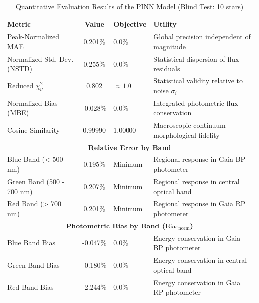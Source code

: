 
\begin{table}[htpb]
\centering
\caption{Quantitative Evaluation Results of the PINN Model (Blind Test: 10 stars)}
\label{tab:pinn_evaluation}
\begin{tabular}{lcll}
\hline
\textbf{Metric} & \textbf{Value} & \textbf{Objective} & \textbf{Utility} \\
\hline
Peak-Normalized MAE & 0.201\% & 0.0\% & Global precision independent of magnitude \\
Normalized Std. Dev. (NSTD) & 0.255\% & 0.0\% & Statistical dispersion of flux residuals \\
Reduced $\chi^2_\nu$ & 0.802 & $\approx 1.0$ & Statistical validity relative to noise $\sigma_i$ \\
Normalized Bias (MBE) & -0.028\% & 0.0\% & Integrated photometric flux conservation \\
Cosine Similarity & 0.99990 & 1.00000 & Macroscopic continuum morphological fidelity \\
\hline
\multicolumn{4}{c}{\textbf{Relative Error by Band}} \\
\hline
Blue Band (< 500 nm) & 0.195\% & Minimum & Regional response in Gaia BP photometer \\
Green Band (500 - 700 nm) & 0.207\% & Minimum & Regional response in central optical band \\
Red Band (> 700 nm) & 0.201\% & Minimum & Regional response in Gaia RP photometer \\
\hline
\multicolumn{4}{c}{\textbf{Photometric Bias by Band ($\text{Bias}_{\text{norm}}$)}} \\
\hline
Blue Band Bias & -0.047\% & 0.0\% & Energy conservation in Gaia BP photometer \\
Green Band Bias & -0.180\% & 0.0\% & Energy conservation in central optical band \\
Red Band Bias & -2.244\% & 0.0\% & Energy conservation in Gaia RP photometer \\
\hline
\end{tabular}
\end{table}
